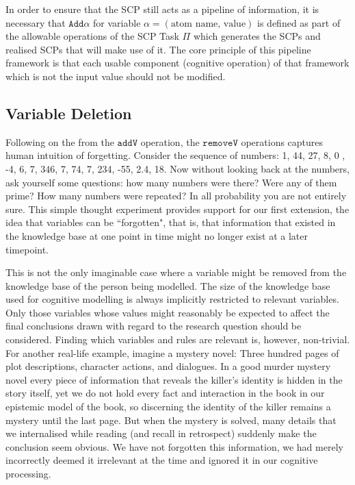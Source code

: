 In order to ensure that the SCP still acts as a pipeline of information, it is necessary that $\texttt{Add}\alpha$ for variable $\alpha=(\text{atom name, value})$ is defined as part of the allowable operations of the SCP Task $\Pi$ which generates the SCPs and realised SCPs that will make use of it. The core principle of this pipeline framework is that each usable component (cognitive operation) of that framework which is not the input value should not be modified.

\subsection{Variable Deletion}
Following on the from the $\texttt{addV}$ operation, the $\texttt{removeV}$ operations captures human intuition of forgetting. Consider the sequence of numbers: 1, 44, 27, 8, 0 , -4, 6, 7, 346, 7, 74, 7, 234, -55, 2.4, 18. Now without looking back at the numbers, ask yourself some questions: how many numbers were there? Were any of them prime? How many numbers were repeated? In all probability you are not entirely sure. This simple thought experiment provides support for our first extension, the idea that variables can be ``forgotten", that is, that information that existed in the knowledge base at one point in time might no longer exist at a later timepoint. 

This is not the only imaginable case where a variable might be removed from the knowledge base of the person being modelled. The size of the knowledge base used for cognitive modelling is always implicitly restricted to relevant variables. Only those variables whose values might reasonably be expected to affect the final conclusions drawn with regard to the research question should be considered. Finding which variables and rules are relevant is, however, non-trivial. For another real-life example, imagine a mystery novel: Three hundred pages of plot descriptions, character actions, and dialogues. In a good murder mystery novel every piece of information that reveals the killer's identity is hidden in the story itself, yet we do not hold every fact and interaction in the book in our epistemic model of the book, so discerning the identity of the killer remains a mystery until the last page. But when the mystery is solved, many details that we internalised while reading (and recall in retrospect) suddenly make the conclusion seem obvious. We have not forgotten this information, we had merely incorrectly deemed it irrelevant at the time and ignored it in our cognitive processing.

